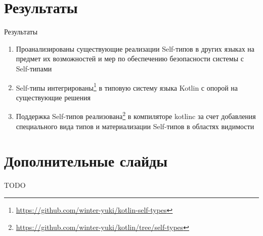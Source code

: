 \documentclass[usenames, dvipsnames]{beamer}
\begin{document}
    \section{Результаты}

    \begin{frame}{Результаты}
        \begin{enumerate}
            \item Проанализированы существующие реализации Self-типов в других языках на предмет их возможностей и мер по обеспечению безопасности системы с Self-типами
            \item Self-типы интегрированы\footnote{\url{https://github.com/winter-yuki/kotlin-self-types}} в типовую систему языка Kotlin с опорой на существующие решения
            \item Поддержка Self-типов реализована\footnote{\url{https://github.com/winter-yuki/kotlin/tree/self-types}} в компиляторе kotlinc за счет добавления специального вида типов и материализации Self-типов в областях видимости
        \end{enumerate}
    \end{frame}


    \appendix


    \section{Дополнительные слайды}

    \begin{frame}{}
        TODO %
    \end{frame}
\end{document}
